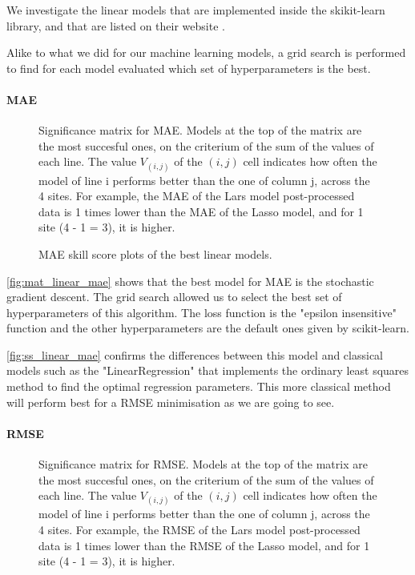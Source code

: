 We investigate the linear models that are implemented inside the skikit-learn library, and that are listed on their website \cite{sklearnlinear}.

Alike to what we did for our machine learning models, a grid search is performed to find for each model evaluated which set of hyperparameters is the best.
\paragraph{MAE}

\begin{figure}[htb!]
    \centering
    
\caption{Significance matrix for MAE. Models at the top of the matrix are the most succesful ones, on the criterium of the sum of the values of each line. The value $V_{(i,j)}$ of the $(i,j)$ cell indicates how often the model of line i performs better than the one of column j, across the 
4 sites. For example, the MAE of the Lars model post-processed data is 1 times lower than the MAE of the Lasso model, and for 1 site (4 - 1 = 3), it is higher.}
\label{fig:mat_linear_mae}
\end{figure}

\begin{figure}[htb!]
    \centering
    
\caption{MAE skill score plots of the best linear models.}
\label{fig:ss_linear_mae}
\end{figure}

\autoref{fig:mat_linear_mae} shows that the best model for MAE is the stochastic gradient descent. 
The grid search allowed us to select the best set of hyperparameters of this algorithm.
The loss function is the "epsilon insensitive" function and the other hyperparameters are the default ones given by scikit-learn.

\autoref{fig:ss_linear_mae} confirms the differences between this model and classical models such as the "LinearRegression" that implements the ordinary least squares method to find the optimal regression parameters. This more classical method will perform best for a RMSE minimisation as we are going to see.
\paragraph{RMSE}
\begin{figure}[htb!]
    \centering
    
\caption{Significance matrix for RMSE. Models at the top of the matrix are the most succesful ones, on the criterium of the sum of the values of each line. The value $V_{(i,j)}$ of the $(i,j)$ cell indicates how often the model of line i performs better than the one of column j, across the 
4 sites. For example, the RMSE of the Lars model post-processed data is 1 times lower than the RMSE of the Lasso model, and for 1 site (4 - 1 = 3), it is higher.}
\label{fig:mat_linear_rmse}
\end{figure}

